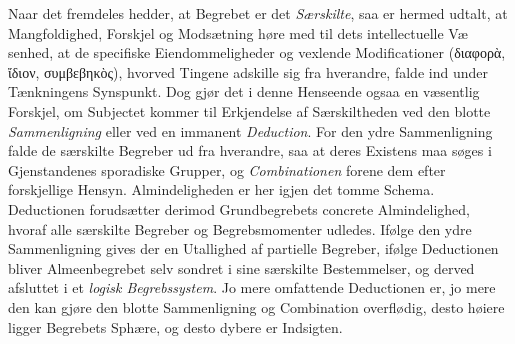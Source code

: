 \documentclass[12pt]{book}
\newcommand{\opage}[1]{\marginnote{\footnotesize\textit{[#1]}}}
\begin{document}
Naar det fremdeles hedder, at Begrebet er det \emph{Særskilte}, saa er hermed
udtalt, at Mangfoldighed, Forskjel og Modsætning høre med til dets intellectuelle
Væ%
\opage{31}senhed, at de specifiske Eiendommeligheder og vexlende Modificationer
(διαφορὰ, ἴδιον, συμβεβηκὸς), hvorved Tingene adskille sig fra hverandre, falde
ind under Tænkningens Synspunkt. Dog gjør det i denne Henseende ogsaa en
væsentlig Forskjel, om Subjectet kommer til Erkjendelse af Særskiltheden ved den
blotte \emph{Sammenligning} eller ved en immanent \emph{Deduction}. For den ydre
Sammenligning falde de særskilte Begreber ud fra hverandre, saa at deres Existens
maa søges i Gjenstandenes sporadiske Grupper, og \emph{Combinationen} forene dem
efter forskjellige Hensyn. Almindeligheden er her igjen det tomme Schema.
Deductionen forudsætter derimod Grundbegrebets concrete Almindelighed, hvoraf
alle særskilte Begreber og Begrebsmomenter udledes. Ifølge den ydre
Sammenligning gives der en Utallighed af partielle Begreber, ifølge Deductionen
bliver Almeenbegrebet selv sondret i sine særskilte Bestemmelser, og derved
afsluttet i et \emph{logisk Begrebssystem}. Jo mere omfattende Deductionen er, jo
mere den kan gjøre den blotte Sammenligning og Combination overflødig, desto
høiere ligger Begrebets Sphære, og desto dybere er Indsigten.
\end{document}
